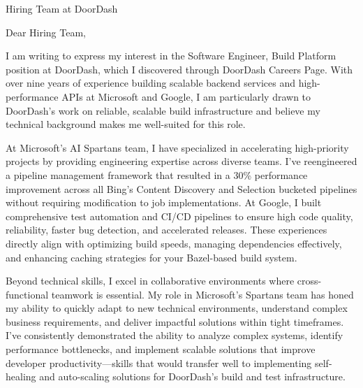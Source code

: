
\newcommand{\COMPANY}{DoorDash}
\newcommand{\POSITION}{Software Engineer, Build Platform}
\newcommand{\SOURCE}{DoorDash Careers Page}
\newcommand{\PRODUCT}{reliable, scalable build infrastructure}
\newcommand{\SPECIFICREASON}{your commitment to providing reliable, scalable, and repeatable cloud infrastructure that empowers thousands of developers to build and deploy great products quickly and safely}
\newcommand{\RELEVANTTECHNOLOGY}{performance optimization and pipeline automation}
\newcommand{\TEAMNAME}{Build \& Deploy Platform team}

\noindent Hiring Team at \COMPANY
\vspace{0.4cm}

\noindent Dear Hiring Team,
\vspace{0.4cm}

I am writing to express my interest in the \POSITION{} position at \COMPANY, which I discovered through \SOURCE. With over nine years of experience building scalable backend services and high-performance APIs at Microsoft and Google, I am particularly drawn to \COMPANY's work on \PRODUCT{} and believe my technical background makes me well-suited for this role.

At Microsoft's AI Spartans team, I have specialized in accelerating high-priority projects by providing engineering expertise across diverse teams. I've reengineered a pipeline management framework that resulted in a 30\% performance improvement across all Bing's Content Discovery and Selection bucketed pipelines without requiring modification to job implementations. At Google, I built comprehensive test automation and CI/CD pipelines to ensure high code quality, reliability, faster bug detection, and accelerated releases. These experiences directly align with optimizing build speeds, managing dependencies effectively, and enhancing caching strategies for your Bazel-based build system.

Beyond technical skills, I excel in collaborative environments where cross-functional teamwork is essential. My role in Microsoft's Spartans team has honed my ability to quickly adapt to new technical environments, understand complex business requirements, and deliver impactful solutions within tight timeframes. I've consistently demonstrated the ability to analyze complex systems, identify performance bottlenecks, and implement scalable solutions that improve developer productivity—skills that would transfer well to implementing self-healing and auto-scaling solutions for DoorDash's build and test infrastructure.


